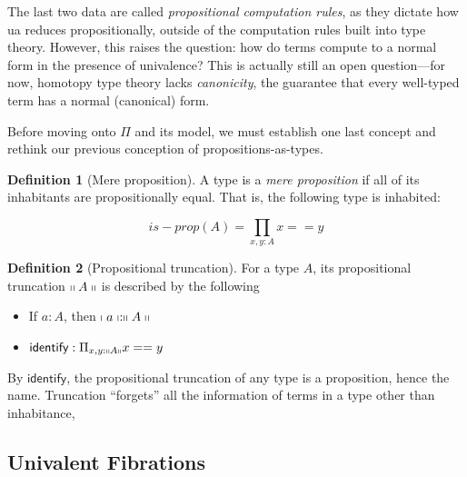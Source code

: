 \documentclass[12pt, letterpaper]{article}
\theoremstyle{definition}
\newtheorem{definition}{Definition}[section]
\begin{document}
The last two data are called \emph{propositional computation rules}, as they dictate how \textsf{ua} reduces propositionally, outside of the computation rules built into type theory. However, this raises the question: how do terms compute to a normal form in the presence of univalence? This is actually still an open question---for now, homotopy type theory lacks \emph{canonicity}, the guarantee that every well-typed term has a normal (canonical) form.

Before moving onto $\Pi$ and its model, we must establish one last concept and rethink our previous conception of propositions-as-types. 

\begin{definition}[Mere proposition]
A type is a \emph{mere proposition} if all of its inhabitants are propositionally equal. That is, the following type is inhabited:

$$is-prop(A) = \prod_{x,y:A} x == y$$
\end{definition}

\begin{definition}[Propositional truncation]
For a type $A$, its propositional truncation $\shortparallel A\shortparallel$ is described by the following
\begin{itemize}
\item If $a : A$, then $\shortmid a\shortmid:\shortparallel A\shortparallel$
\item $\textsf{identify}:\Pi_{x,y:\shortparallel A\shortparallel} x == y$
\end{itemize}

By $\textsf{identify}$, the propositional truncation of any type is a proposition, hence the name. Truncation ``forgets'' all the information of terms in a type other than inhabitance, 
\end{definition}

\subsection{Univalent Fibrations}
\end{document}
